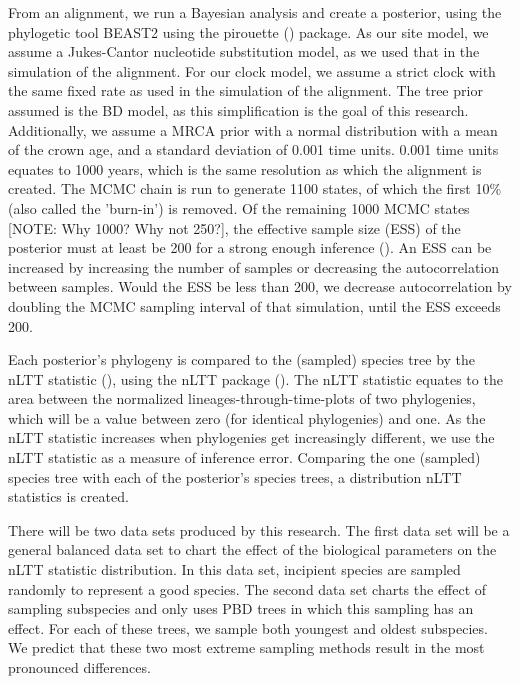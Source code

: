 \documentclass{article}
\begin{document}
From an alignment, we run a Bayesian analysis and create a posterior, 
using the phylogetic tool BEAST2 \cite{beast2} using the 
pirouette (\cite{pirouette}) package. As our site model, we assume a Jukes-Cantor 
nucleotide substitution model, as we used that in the simulation of the alignment.
For our clock model, we assume a strict clock with the same fixed rate as 
used in the simulation of the alignment. The tree prior assumed is the BD model, 
as this simplification is the goal of this research. 
Additionally, we assume a MRCA prior with a normal distribution
with a mean of the crown age, and a standard deviation of 0.001 time units. 0.001
time units equates to 1000 years, which is the same resolution as which the
alignment is created. The MCMC chain is run to generate 1100 states,
of which the first 10\% (also called the 'burn-in') is removed. Of the remaining
1000 MCMC states [NOTE: Why 1000? Why not 250?], 
the effective sample size (ESS) of the posterior must at least be 200
for a strong enough inference (\cite{beastbook}). An ESS can be increased by increasing
the number of samples or decreasing the autocorrelation between samples. 
Would the ESS be less than 200, we decrease autocorrelation by doubling 
the MCMC sampling interval of that simulation, until the ESS exceeds 200.

Each posterior's phylogeny is compared to the (sampled) species tree
by the nLTT statistic (\cite{janzen2015}), using the nLTT package (\cite{nltt}). 
The nLTT statistic equates to the area between the normalized
lineages-through-time-plots of two phylogenies, which will be a value between 
zero (for identical phylogenies) and one. As the nLTT statistic increases
when phylogenies get increasingly different, we use the nLTT statistic
as a measure of inference error. Comparing the one (sampled) species tree
with each of the posterior's species trees, a distribution nLTT statistics
is created. 

There will be two data sets produced by this research.
The first data set will be a general balanced data set to chart
the effect of the biological parameters on the nLTT statistic
distribution. In this data set, incipient species are sampled 
randomly to represent a good species.
The second data set charts the effect of sampling
subspecies and only uses PBD trees in which this sampling
has an effect. For each of these trees, we sample both youngest and
oldest subspecies. We predict that these two most extreme sampling methods
result in the most pronounced differences.
\end{document}
